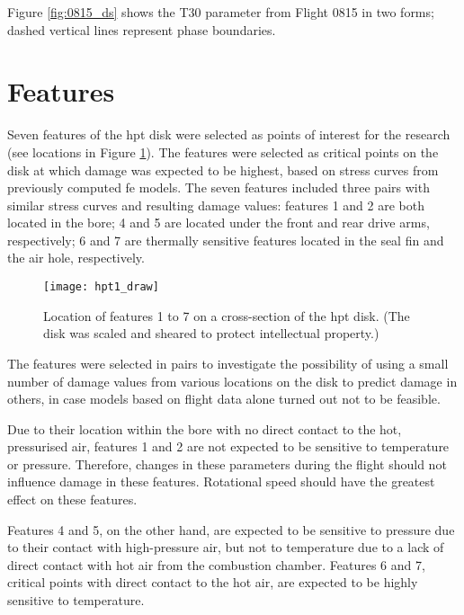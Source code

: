 Figure \ref{fig:0815_ds} shows the T30 parameter from Flight 0815 in two forms; dashed vertical lines represent phase boundaries.

\section{Features} \label{sec:features}
Seven features of the \ac{hpt} disk were selected as points of interest for the research (see locations in Figure \ref{fig:hpt1}). The features were selected as critical points on the disk at which damage was expected to be highest, based on stress curves from previously computed \ac{fe} models. The seven features included three pairs with similar stress curves and resulting damage values: features 1 and 2 are both located in the bore; 4 and 5 are located under the front and rear drive arms, respectively; 6 and 7 are thermally sensitive features located in the seal fin and the air hole, respectively.

\begin{figure}
    \centering
    \texttt{[image: hpt1\_draw]}
    \caption{\label{fig:hpt1} Location of features 1 to 7 on a cross-section of the \ac{hpt} disk. (The disk was scaled and sheared to protect intellectual property.)}
\end{figure}

The features were selected in pairs to investigate the possibility of using a small number of damage values from various locations on the disk to predict damage in others, in case models based on flight data alone turned out not to be feasible.

Due to their location within the bore with no direct contact to the hot, pressurised air, features 1 and 2 are not expected to be sensitive to temperature or pressure. Therefore, changes in these parameters during the flight should not influence damage in these features. Rotational speed should have the greatest effect on these features.

Features 4 and 5, on the other hand, are expected to be sensitive to pressure due to their contact with high-pressure air, but not to temperature due to a lack of direct contact with hot air from the combustion chamber. Features 6 and 7, critical points with direct contact to the hot air, are expected to be highly sensitive to temperature.

